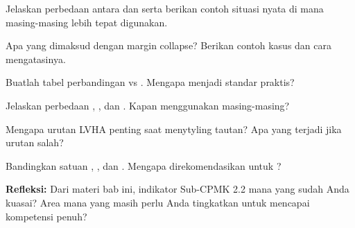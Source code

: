 \documentclass[../main.tex]{subfiles}
\begin{document}
\begin{latihan}
  \item Jelaskan perbedaan antara  dan  serta berikan contoh situasi nyata di mana masing-masing lebih tepat digunakan.
  \item Apa yang dimaksud dengan margin collapse? Berikan contoh kasus dan cara mengatasinya.
  \item Buatlah tabel perbandingan  vs . Mengapa  menjadi standar praktis?
  \item Jelaskan perbedaan , , dan . Kapan menggunakan masing-masing?
  \item Mengapa urutan LVHA penting saat menytyling tautan? Apa yang terjadi jika urutan salah?
  \item Bandingkan satuan , , dan . Mengapa  direkomendasikan untuk ?
  \item \textbf{Refleksi:} Dari materi bab ini, indikator Sub-CPMK 2.2 mana yang sudah Anda kuasai? Area mana yang masih perlu Anda tingkatkan untuk mencapai kompetensi penuh?
\end{latihan}
\end{document}

